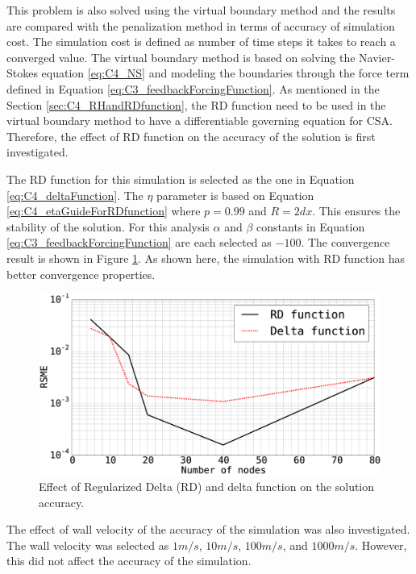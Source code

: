 This problem is also solved using the virtual boundary method and the results are compared with the penalization method in terms of accuracy of simulation cost. The simulation cost is defined as number of time steps it takes to reach a converged value. The virtual boundary method is based on solving the Navier-Stokes equation \eqref{eq:C4_NS} and modeling the boundaries through the force term defined in Equation \eqref{eq:C3_feedbackForcingFunction}. As mentioned in the Section \ref{sec:C4_RHandRDfunction}, the RD function need to be used in the virtual boundary method to have a differentiable governing equation for CSA. Therefore, the effect of RD function on the accuracy of the solution is first investigated.

The RD function for this simulation is selected as the one in Equation \eqref{eq:C4_deltaFunction}. The $\eta$ parameter is based on Equation \eqref{eq:C4_etaGuideForRDfunction} where $p = 0.99$ and $R = 2dx$. This ensures the stability of the solution. For this analysis $\alpha$ and $\beta$ constants in Equation \eqref{eq:C3_feedbackForcingFunction} are each selected as $-100$. The convergence result is shown in Figure \ref{fig:C4_virtualBoundary_RDvsD}. As shown here, the simulation with RD function has better convergence properties.

\begin{figure}[H]
	\centering
	\includegraphics[width=12.00cm]{Chapter_4/figure/effect_of_RD_on_simulation_vs_numberOfNodes_1D_problem.eps}
	\caption{Effect of Regularized Delta (RD) and delta function on the solution accuracy.}
	\label{fig:C4_virtualBoundary_RDvsD}
\end{figure}

The effect of wall velocity of the accuracy of the simulation was also investigated. The wall velocity was selected as $1 m/s$, $10 m/s$, $100 m/s$, and $1000 m/s$. However, this did not affect the accuracy of the simulation.

